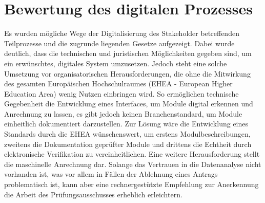 \section{Bewertung des digitalen Prozesses}

Es wurden mögliche Wege der Digitalisierung des Stakeholder betreffenden Teilprozesse und die zugrunde liegenden Gesetze aufgezeigt. Dabei wurde deutlich, dass die technischen und juristischen Möglichkeiten gegeben sind, um ein erwünschtes, digitales System umzusetzen. Jedoch steht eine solche Umsetzung vor organisatorischen Herausforderungen, die ohne die Mitwirkung des gesamten Europäischen Hochschulraumes (EHEA - European Higher Education Area) wenig Nutzen einbringen wird. So ermöglichen technische Gegebenheit die Entwicklung eines Interfaces, um Module digital erkennen und Anrechnung zu lassen, es gibt jedoch keinen Branchenstandard, um Module einheitlich dokumentiert darzustellen.
Zur Lösung wäre die Entwicklung eines Standards durch die EHEA wünschenswert, um erstens Modulbeschreibungen, zweitens die Dokumentation geprüfter Module und drittens die Echtheit durch elektronische Verifikation zu vereinheitlichen.
Eine weitere Herausforderung stellt die maschinelle Anrechnung dar. Solange das Vertrauen in die Datenanalyse nicht vorhanden ist, was vor allem in Fällen der Ablehnung eines Antrags problematisch ist, kann aber eine rechnergestützte Empfehlung zur Anerkennung die Arbeit des Prüfungsausschusses erheblich erleichtern.
